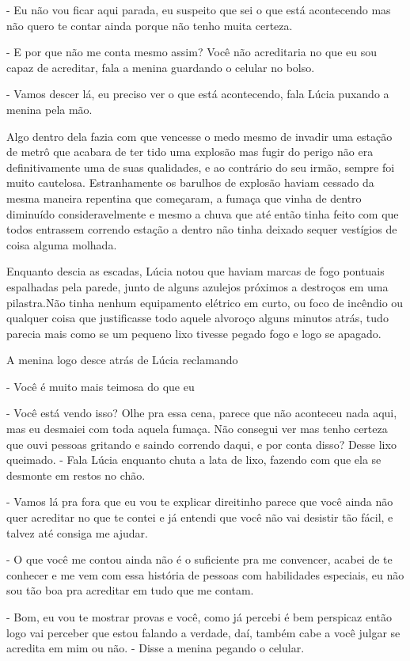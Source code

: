 - Eu não vou ficar aqui parada, eu suspeito que sei o que está acontecendo mas não quero te contar ainda porque não tenho muita certeza.

- E por que não me conta mesmo assim? Você não acreditaria no que eu sou capaz de acreditar, fala a menina guardando o celular no bolso.

- Vamos descer lá, eu preciso ver o que está acontecendo, fala Lúcia puxando a menina pela mão.

Algo dentro dela fazia com que vencesse o medo mesmo de invadir uma estação de metrô que acabara de ter tido uma explosão mas fugir do perigo não era definitivamente uma de suas qualidades, e ao contrário do seu irmão, sempre foi muito cautelosa.
Estranhamente os barulhos de explosão haviam cessado da mesma maneira repentina que começaram, a fumaça que vinha de dentro diminuído consideravelmente e mesmo a chuva que até então tinha feito com que todos entrassem correndo estação a dentro não tinha deixado sequer vestígios de coisa alguma molhada.

Enquanto descia as escadas, Lúcia notou que haviam marcas de fogo pontuais espalhadas pela parede, junto de alguns azulejos próximos a destroços em uma pilastra.Não tinha nenhum equipamento elétrico em curto, ou foco de incêndio ou qualquer coisa que justificasse todo aquele alvoroço alguns minutos atrás, tudo parecia mais como se um pequeno lixo tivesse pegado fogo e logo se apagado. 

A menina logo desce atrás de Lúcia reclamando

- Você é muito mais teimosa do que eu

- Você está vendo isso? Olhe pra essa cena, parece que não aconteceu nada aqui, mas eu desmaiei com toda aquela fumaça. Não consegui ver mas tenho certeza que ouvi pessoas gritando e saindo correndo daqui, e por conta disso? Desse lixo queimado. - Fala Lúcia enquanto chuta a lata de lixo, fazendo com que ela se desmonte em restos no chão.

- Vamos lá pra fora que eu vou te explicar direitinho parece que você ainda não quer acreditar no que te contei e já entendi que você não vai desistir tão fácil, e talvez até consiga me ajudar.

- O que você me contou ainda não é o suficiente pra me convencer, acabei de te conhecer e me vem com essa história de pessoas com habilidades especiais, eu não sou tão boa pra acreditar em tudo que me contam.

- Bom, eu vou te mostrar provas e você, como já percebi é bem perspicaz então logo vai perceber que estou falando a verdade, daí, também cabe a você julgar se acredita em mim ou não. - Disse a menina pegando o celular.

